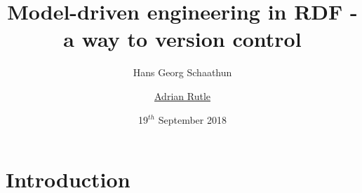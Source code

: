 \documentclass[dvips,slidetop,mathserif,brown]{beamer}
\begin{document}
\title{Model-driven engineering in RDF - a way to version control}%

\subject{Model-driven engineering in RDF - a way to version control}

\author[Adrian Rutle]{Hans Georg Schaathun \and \underline{Adrian Rutle}}


\date[19 Sept 2018]{19$^{th}$ September 2018}


\section{Introduction}

\begin{frame}
  \titlepage
\end{frame}

\end{document}
